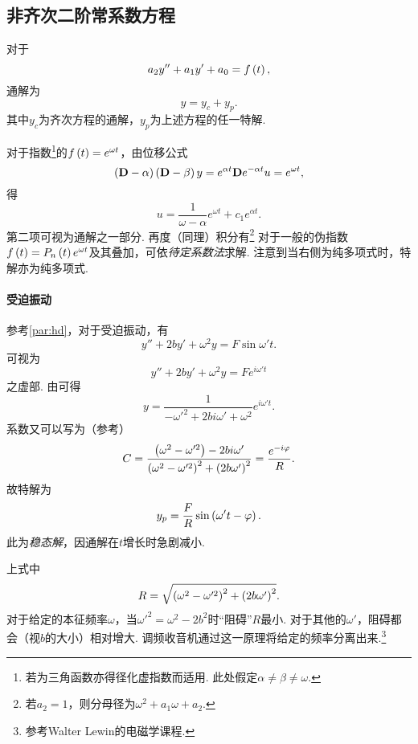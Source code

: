 \documentclass[UTF-8]{ctexart}
\begin{document}
  \subsection{非齐次二阶常系数方程}
  对于
  \[ a_2 y'' + a_1 y' + a_0 = f\left(t\right), \]
  通解为
  \[ y = y_c + y_p. \]
  其中$y_c$为齐次方程的通解，$y_p$为上述方程的任一特解.
  \par
  对于指数\footnote{若为三角函数亦得径化虚指数而适用. 此处假定$\alpha \neq \beta \neq \omega$.}的$f\left(t\right)=e^{\omega t}$，由位移公式
  \[ \left(\mathbf{D}-\alpha\right)\left(\mathbf{D}-\beta\right)y = e^{\alpha t} \mathbf{D} e^{-\alpha t} u = e^{\omega t}, \]
  得
  \[ u = \frac{1}{\omega - \alpha}e^{\omega t} + c_1 e^{\alpha t}. \]
  第二项可视为通解之一部分. 再度（同理）积分有\footnote{若$a_2=1$，则分母径为$\omega^2 + a_1 \omega + a_2$.}
  对于一般的伪指数$f\left(t\right)=P_n\left(t\right) e^{\omega t}$及其叠加，可依\emph{待定系数法}求解.
  注意到当右侧为纯多项式时，特解亦为纯多项式.
  \paragraph{受迫振动}参考\ref{par:hd}，对于受迫振动，有
  \[ y'' + 2by' + \omega^2 y = F \sin \omega' t. \]
  可视为
  \[ y'' + 2by' + \omega^2 y = F e^{i\omega' t} \]
  之虚部. 由可得
  \[ y = \frac{1}{-\omega'^2 + 2bi\omega' + \omega^2}e^{i\omega' t}. \]
  系数又可以写为（参考）
  \[ C = \frac{\left(\omega^2-\omega'^2\right) - 2bi\omega'}{\left(\omega^2-\omega'^2\right)^2 + \left(2b\omega'\right)^2} = \frac{e^{-i\varphi}}{R}. \]
  故特解为
  \[ y_p = \frac{F}{R}\sin\left(\omega't - \varphi\right). \]
  此为\emph{稳态解}，因通解在$t$增长时急剧减小.
  \par
  上式中
  \[ R = \sqrt{\left(\omega^2-\omega'^2\right)^2 + \left(2b\omega'\right)^2}. \]
  对于给定的本征频率$\omega$，当$\omega'^2=\omega^2-2b^2$时“阻碍”$R$最小. 对于其他的$\omega'$，阻碍都会（视$b$的大小）相对增大. 调频收音机通过这一原理将给定的频率分离出来.\footnote{参考Walter Lewin的电磁学课程.}
\end{document}

